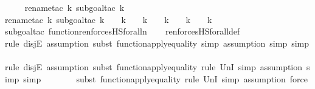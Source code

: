 \begin{isabellebody}
\ \ \ \ \isamarkupfalse%
{\isacharparenleft}{\kern0pt}rename{\isacharunderscore}{\kern0pt}tac\ k{\isacharcomma}{\kern0pt}\ subgoal{\isacharunderscore}{\kern0pt}tac\ {\isachardoublequoteopen}k\ {\isacharless}{\kern0pt}\ {}{\isachardoublequoteclose}{\isacharparenright}{\kern0pt}\isanewline
\ \ \ \ \ \isamarkupfalse%
{\isacharparenleft}{\kern0pt}rename{\isacharunderscore}{\kern0pt}tac\ k{\isacharcomma}{\kern0pt}\ subgoal{\isacharunderscore}{\kern0pt}tac\ {\isachardoublequoteopen}k\ {\isacharequal}{\kern0pt}\ {}\ {\isasymor}\ k\ {\isacharequal}{\kern0pt}\ {}\ {\isasymor}\ k\ {\isacharequal}{\kern0pt}\ {}\ {\isasymor}\ k\ {\isacharequal}{\kern0pt}\ {}\ {\isasymor}\ k\ {\isacharequal}{\kern0pt}\ {}\ {\isasymor}\ k\ {\isacharequal}{\kern0pt}\ {}{\isachardoublequoteclose}{\isacharparenright}{\kern0pt}\ \isanewline
\ \ \ \ \ \ \isamarkupfalse%
{\isacharparenleft}{\kern0pt}subgoal{\isacharunderscore}{\kern0pt}tac\ {\isachardoublequoteopen}function{\isacharparenleft}{\kern0pt}ren{\isacharunderscore}{\kern0pt}forcesHS{\isacharunderscore}{\kern0pt}forall{\isacharparenleft}{\kern0pt}n{\isacharparenright}{\kern0pt}{\isacharparenright}{\kern0pt}{\isachardoublequoteclose}{\isacharparenright}{\kern0pt}\isanewline
\ \ \isamarkupfalse%
\ ren{\isacharunderscore}{\kern0pt}forcesHS{\isacharunderscore}{\kern0pt}forall{\isacharunderscore}{\kern0pt}def\isanewline
\ \ \ \ \ \ \isamarkupfalse%
{\isacharparenleft}{\kern0pt}rule\ disjE{\isacharcomma}{\kern0pt}\ assumption{\isacharcomma}{\kern0pt}\ subst\ function{\isacharunderscore}{\kern0pt}apply{\isacharunderscore}{\kern0pt}equality{\isacharcomma}{\kern0pt}\ simp{\isacharcomma}{\kern0pt}\ assumption{\isacharcomma}{\kern0pt}\ simp{\isacharcomma}{\kern0pt}\ simp{\isacharparenright}{\kern0pt}\isanewline
\ \ \ \ \ \ \ \isamarkupfalse%
{\isacharparenleft}{\kern0pt}rule\ disjE{\isacharcomma}{\kern0pt}\ assumption{\isacharcomma}{\kern0pt}\ subst\ function{\isacharunderscore}{\kern0pt}apply{\isacharunderscore}{\kern0pt}equality{\isacharcomma}{\kern0pt}\ rule\ UnI{}{\isacharcomma}{\kern0pt}\ simp{\isacharcomma}{\kern0pt}\ assumption{\isacharcomma}{\kern0pt}\ simp{\isacharcomma}{\kern0pt}\ simp{\isacharparenright}{\kern0pt}{\isacharplus}{\kern0pt}\isanewline
\ \ \ \ \ \ \ \isamarkupfalse%
{\isacharparenleft}{\kern0pt}subst\ function{\isacharunderscore}{\kern0pt}apply{\isacharunderscore}{\kern0pt}equality{\isacharcomma}{\kern0pt}\ rule\ UnI{}{\isacharcomma}{\kern0pt}\ simp{\isacharcomma}{\kern0pt}\ assumption{\isacharcomma}{\kern0pt}\ force{\isacharparenright}{\kern0pt}\isanewline

\end{isabellebody}
